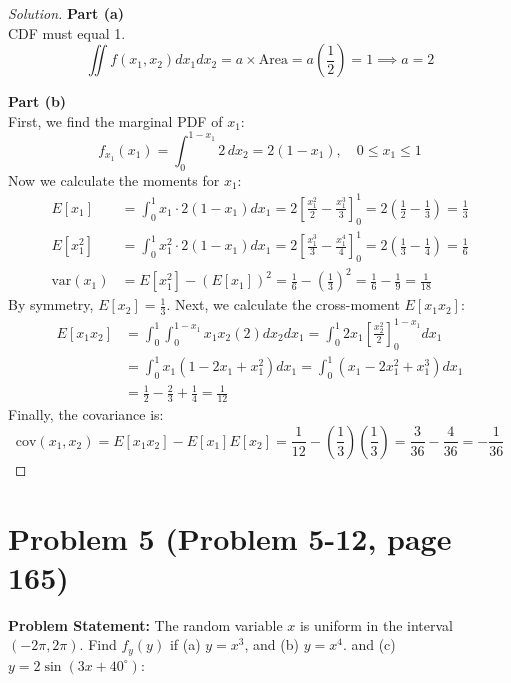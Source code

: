 \documentclass{article}
\begin{document}
\begin{proof}[Solution]
	\textbf{Part (a)}\\
	CDF must equal 1.
	\[
		\iint f(x_1, x_2) dx_1 dx_2 = a \times \text{Area} = a \left(\frac{1}{2}\right) = 1 \implies a = 2
	\]

	\textbf{Part (b)}\\
	First, we find the marginal PDF of $x_1$:
	\[
		f_{x_1}(x_1) = \int_0^{1-x_1} 2 \,dx_2 = 2(1 - x_1), \quad 0 \le x_1 \le 1
	\]
	Now we calculate the moments for $x_1$:
	\begin{align*}
		E[x_1] &= \int_0^1 x_1 \cdot 2(1-x_1) dx_1 = 2 \left[ \frac{x_1^2}{2} - \frac{x_1^3}{3} \right]_0^1 = 2\left(\frac{1}{2} - \frac{1}{3}\right) = \frac{1}{3} \\
		E[x_1^2] &= \int_0^1 x_1^2 \cdot 2(1-x_1) dx_1 = 2 \left[ \frac{x_1^3}{3} - \frac{x_1^4}{4} \right]_0^1 = 2\left(\frac{1}{3} - \frac{1}{4}\right) = \frac{1}{6} \\
		\text{var}(x_1) &= E[x_1^2] - (E[x_1])^2 = \frac{1}{6} - \left(\frac{1}{3}\right)^2 = \frac{1}{6} - \frac{1}{9} = \frac{1}{18}
	\end{align*}
	By symmetry, $E[x_2] = \frac{1}{3}$. Next, we calculate the cross-moment $E[x_1 x_2]$:
	\begin{align*}
		E[x_1 x_2] &= \int_0^1 \int_0^{1-x_1} x_1 x_2 (2) dx_2 dx_1 = \int_0^1 2 x_1 \left[ \frac{x_2^2}{2} \right]_0^{1-x_1} dx_1 \\
		&= \int_0^1 x_1 (1 - 2x_1 + x_1^2) dx_1 = \int_0^1 (x_1 - 2x_1^2 + x_1^3) dx_1 \\
		&= \frac{1}{2} - \frac{2}{3} + \frac{1}{4} = \frac{1}{12}
	\end{align*}
	Finally, the covariance is:
	\[
		\text{cov}(x_1, x_2) = E[x_1 x_2] - E[x_1]E[x_2] = \frac{1}{12} - \left(\frac{1}{3}\right)\left(\frac{1}{3}\right) = \frac{3}{36} - \frac{4}{36} = -\frac{1}{36}
	\]
\end{proof}

\vspace{1cm}

\section*{Problem 5 (Problem 5-12, page 165)}
\textbf{Problem Statement:}
The random variable $x$ is uniform in the interval $(-2\pi, 2\pi)$. Find $f_y(y)$ if (a) $y = x^3$, and (b) $y = x^4$.
and (c) $y = 2 \sin(3x + 40^\circ)$: \\ 
\end{document}
